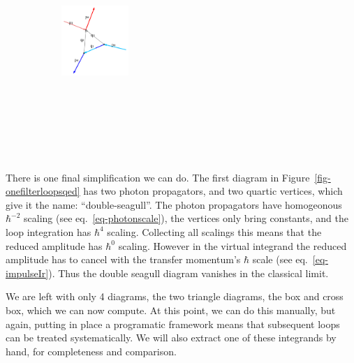 \documentclass[
  11pt,
  a4paper,
  DIV=11,
  numbers=noendperiod,
  twoside]{scrreprt}
\DeclareRobustCommand{\[}{\begin{equation}}
\DeclareRobustCommand{\]}{\end{equation}}
\begin{document}
\begin{figure}
\begin{minipage}[t]{0.20\linewidth}
{\begin{figure}[H]
{}

\end{figure}

}

\end{minipage}%
%
\begin{minipage}[t]{0.20\linewidth}

{\centering 

\begin{figure}[H]

{\centering \includegraphics[width=1in,height=3.5in]{./scattering_files/figure-latex/dot-figure-5.png}

}

\end{figure}

}

\end{minipage}%

\end{figure}

There is one final simplification we can do. The first diagram in
Figure~\ref{fig-onefilterloopsqed} has two photon propagators, and two
quartic vertices, which give it the name: ``double-seagull''. The photon
propagators have homogeonous \(\hbar^{-2}\) scaling (see
eq.~\ref{eq-photonscale}), the vertices only bring constants, and the
loop integration has \(\hbar^4\) scaling. Collecting all scalings this
means that the reduced amplitude has \(\hbar^0\) scaling. However in the
virtual integrand the reduced amplitude has to cancel with the transfer
momentum's \(\hbar\) scale (see eq.~\ref{eq-impulseIr}). Thus the double
seagull diagram vanishes in the classical limit.

We are left with only 4 diagrams, the two triangle diagrams, the box and
cross box, which we can now compute. At this point, we can do this
manually, but again, putting in place a programatic framework means that
subsequent loops can be treated systematically. We will also extract one of these integrands by
hand, for completeness and comparison.
\end{document}
